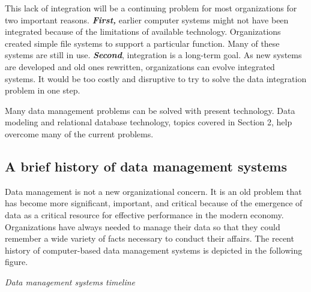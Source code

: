 \documentclass[
]{article}
\begin{document}
This lack of integration will be a continuing problem for most
organizations for two important reasons. \textbf{\emph{First,}} earlier computer
systems might not have been integrated because of the limitations of
available technology. Organizations created simple file systems to
support a particular function. Many of these systems are still in use.
\textbf{\emph{Second}}, integration is a long-term goal. As new systems are
developed and old ones rewritten, organizations can evolve integrated
systems. It would be too costly and disruptive to try to solve the data
integration problem in one step.

Many data management problems can be solved with present technology.
Data modeling and relational database technology, topics covered in
Section 2, help overcome many of the current problems.

\hypertarget{a-brief-history-of-data-management-systems}{%
\subsection*{A brief history of data management systems}\label{a-brief-history-of-data-management-systems}}

Data management is not a new organizational concern. It is an old
problem that has become more significant, important, and critical
because of the emergence of data as a critical resource for effective
performance in the modern economy. Organizations have always needed to
manage their data so that they could remember a wide variety of facts
necessary to conduct their affairs. The recent history of computer-based
data management systems is depicted in the following figure.

\emph{Data management systems timeline}
\end{document}
